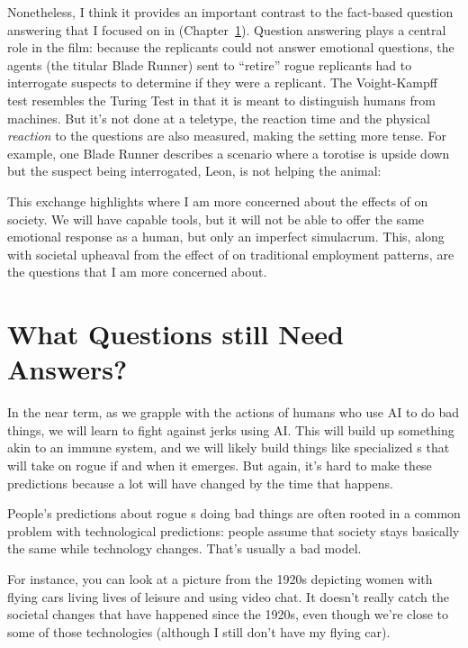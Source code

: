 Nonetheless, I think it provides an important contrast to the
fact-based question answering that I focused on in (Chapter~\ref{}).
%
Question answering plays a central role in the film: because the
replicants could not answer emotional questions, the agents (the
titular Blade Runner) sent to ``retire'' rogue replicants had to
interrogate suspects to determine if they were a replicant.
%
The Voight-Kampff test resembles the Turing Test in that it is meant
to distinguish humans from machines.
%
But it's not done at a teletype, the reaction time and the physical
\emph{reaction} to the questions are also measured, making the setting
more tense.
%
For example, one Blade Runner describes a scenario where a torotise is
upside down but the suspect being interrogated, Leon, is not helping
the animal: 

This exchange highlights where I am more concerned about the effects of  on society.
%
We will have capable  tools, but it will not be able to offer the same emotional response as a human, but only an imperfect simulacrum.
%
This, along with societal upheaval from the effect of  on
traditional employment patterns, are the questions that I am more
concerned about.

\section{What Questions still Need Answers?}

In the near term, as we grapple with the actions of humans who use AI
to do bad things, we will learn to fight against jerks using AI.
%
This will build up something akin to an immune system, and we will
likely build things like specialized s that will take on rogue
 if and when it emerges. But again, it's hard to make these
predictions because a lot will have changed by the time that happens.

People's predictions about rogue s doing bad things are often rooted
in a common problem with technological predictions: people assume that
society stays basically the same while technology changes. That's
usually a bad model.

For instance, you can look at a picture from the 1920s depicting women
with flying cars living lives of leisure and using video chat.
It
doesn't really catch the societal changes that have happened since the
1920s, even though we're close to some of those technologies (although
I still don't have my flying car).

